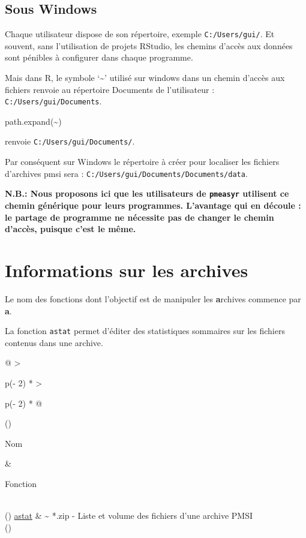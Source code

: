 \documentclass[
]{book}
\newenvironment{Shaded}{\begin{snugshade}}{\end{snugshade}}
\newcommand{\FunctionTok}[1]{\textcolor[rgb]{0.00,0.00,0.00}{#1}}
\newcommand{\NormalTok}[1]{#1}
\newcommand{\StringTok}[1]{\textcolor[rgb]{0.31,0.60,0.02}{#1}}
\begin{document}
\hypertarget{sous-windows}{%
\subsection{Sous Windows}\label{sous-windows}}

Chaque utilisateur dispose de son répertoire, exemple \texttt{C:/Users/gui/}. Et souvent, sans l'utilisation de projets RStudio, les chemins d'accès aux données sont pénibles à configurer dans chaque programme.

Mais dans R, le symbole `\textasciitilde{}' utilisé sur windows dans un chemin d'accès aux fichiers renvoie au répertoire Documents de l'utilisateur : \texttt{C:/Users/gui/Documents}.

\begin{Shaded}
\begin{Highlighting}[]
\FunctionTok{path.expand}\NormalTok{(}\StringTok{\textquotesingle{}\textasciitilde{}\textquotesingle{}}\NormalTok{)}
\end{Highlighting}
\end{Shaded}

renvoie \texttt{C:/Users/gui/Documents/}.

Par conséquent sur Windows le répertoire à créer pour localiser les fichiers d'archives pmsi sera : \texttt{C:/Users/gui/Documents/Documents/data}.

\textbf{N.B.: Nous proposons ici que les utilisateurs de \texttt{pmeasyr} utilisent ce chemin générique pour leurs programmes. L'avantage qui en découle : le partage de programme ne nécessite pas de changer le chemin d'accès, puisque c'est le même.}

\hypertarget{informations-sur-les-archives}{%
\section{Informations sur les archives}\label{informations-sur-les-archives}}

Le nom des fonctions dont l'objectif est de manipuler les \textbf{a}rchives commence par \textbf{a}.

La fonction \texttt{astat} permet d'éditer des statistiques sommaires sur les fichiers contenus dans une archive.

\begin{longtable}[]{@{}
  >{\raggedright\arraybackslash}p{(\columnwidth - 2\tabcolsep) * }
  >{\raggedright\arraybackslash}p{(\columnwidth - 2\tabcolsep) * }@{}}
\toprule()
\begin{minipage}[b]{\linewidth}\raggedright
Nom
\end{minipage} & \begin{minipage}[b]{\linewidth}\raggedright
Fonction
\end{minipage} \\
\midrule()
\endhead
\href{https://guillaumepressiat.github.io/pmeasyr/reference/astat.html}{astat} & \textasciitilde{} *.zip - Liste et volume des fichiers d'une archive PMSI \\
\bottomrule()
\end{longtable}
\end{document}
